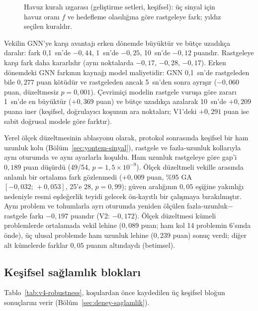 \begin{figure}[!htbp]
\centering

\caption{Havuz kuralı ızgarası (geliştirme setleri, keşifsel): üç sinyal için havuz oranı $f$ ve hedefleme olasılığına göre rastgeleye fark; yıldız seçilen kuraldır.}
\label{fig:v3-pool-grid}
\end{figure}

Vekilin GNN'ye karşı avantajı erken dönemde büyüktür ve bütçe uzadıkça daralır: fark 0,1~sn'de
$-0{,}44$, 1~sn'de $-0{,}25$, 10~sn'de $-0{,}12$ puandır.
Rastgeleye karşı fark daha kararlıdır (aynı noktalarda $-0{,}17$, $-0{,}28$, $-0{,}17$).
Erken dönemdeki GNN farkının kaynağı model maliyetidir: GNN 0,1~sn'de rastgeleden bile
$0{,}277$ puan kötüdür ve rastgeleden ancak 5~sn'den sonra ayrışır ($-0{,}060$
puan, düzeltmesiz $p=0{,}001$).
Çevrimiçi modelin rastgele vuruşa göre zararı 1~sn'de en büyüktür ($+0{,}369$ puan) ve bütçe
uzadıkça azalarak 10~sn'de $+0{,}209$ puana iner (keşifsel, doğrulayıcı koşunun ara noktaları; V1'deki
$+0{,}291$ puan ise sabit doğrusal modele göre farktır).

Yerel ölçek düzeltmesinin ablasyonu olarak, protokol sonrasında keşifsel bir ham uzunluk kolu (Bölüm~\ref{sec:yontem-sinyal}), rastgele ve
fazla-uzunluk kollarıyla aynı oturumda ve aynı ayarlarla koşuldu. Ham uzunluk rastgeleye
göre gap'i $0{,}189$ puan düşürdü (49/54, $p=1{,}5\times10^{-9}$).
Ölçek düzeltmeli vekille arasında anlamlı bir ortalama fark gözlenmedi ($+0{,}009$ puan, \%95 GA
$[-0{,}032;\,+0{,}053]$, 25'e 28, $p=0{,}99$); güven aralığının $0{,}05$ eşiğine yakınlığı nedeniyle
resmi eşdeğerlik teyidi gelecek ön-kayıtlı bir çalışmaya bırakılmıştır.
Aynı problem ve tohumlarla ayrı oturumda yeniden ölçülen fazla-uzunluk$-$rastgele farkı
$-0{,}197$ puandır (V2: $-0{,}172$).
Ölçek düzeltmesi kümeli problemlerde ortalamada vekil lehine ($0{,}089$ puan; ham kol 14 problemin
6'sında önde), üç ulusal problemde ham uzunluk lehine ($0{,}239$ puan) sonuç verdi; diğer alt
kümelerde farklar $0{,}05$ puanın altındaydı (betimsel).

\subsection{Keşifsel sağlamlık blokları}\label{sec:bulgular-saglamlik}

Tablo~\ref{tab:v4-robustness}, koşulardan önce kaydedilen üç keşifsel bloğun sonuçlarını verir
(Bölüm~\ref{sec:deney-saglamlik}).

